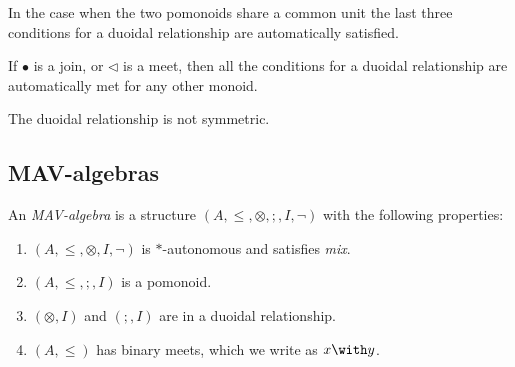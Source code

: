 \begin{remark}
  In the case when the two pomonoids share a common unit the last
  three conditions for a duoidal relationship are automatically
  satisfied.
\end{remark}

\begin{remark}
  If $\bullet$ is a join, or $\lhd$ is a meet, then all the conditions
  for a duoidal relationship are automatically met for any other
  monoid. 
\end{remark}

\begin{remark}
  The duoidal relationship is not symmetric.
\end{remark}

\subsection{MAV-algebras}

\begin{definition}
  An \emph{MAV-algebra} is a structure
  $(A, \leq, \otimes, ;, I, \lnot)$ with the following properties:
  \begin{enumerate}
    \item $(A, \leq, \otimes, I, \lnot)$ is $*$-autonomous and satisfies \emph{mix}.
    \item $(A, \leq, ;, I)$ is a pomonoid.
    \item $(\otimes, I)$ and $(;, I)$ are in a duoidal relationship.
    \item $(A, \leq)$ has binary meets, which we write as $x \with y$.
  \end{enumerate}
\end{definition}

